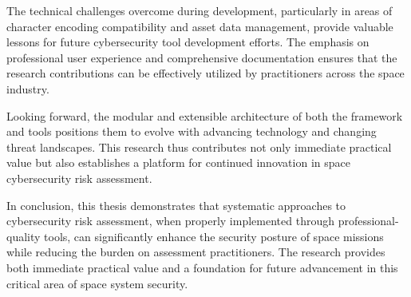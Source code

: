 \documentclass[binding=0.6cm]{sapthesis}
\begin{document}
The technical challenges overcome during development, particularly in areas of character encoding compatibility and asset data management, provide valuable lessons for future cybersecurity tool development efforts. The emphasis on professional user experience and comprehensive documentation ensures that the research contributions can be effectively utilized by practitioners across the space industry.

Looking forward, the modular and extensible architecture of both the framework and tools positions them to evolve with advancing technology and changing threat landscapes. This research thus contributes not only immediate practical value but also establishes a platform for continued innovation in space cybersecurity risk assessment.

In conclusion, this thesis demonstrates that systematic approaches to cybersecurity risk assessment, when properly implemented through professional-quality tools, can significantly enhance the security posture of space missions while reducing the burden on assessment practitioners. The research provides both immediate practical value and a foundation for future advancement in this critical area of space system security.

\backmatter


\printbibliography
\end{document}
